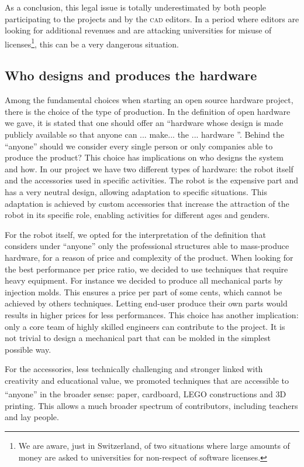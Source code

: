 \documentclass[letterpaper, 10 pt, conference]{ieeeconf}  %
\begin{document}
As a conclusion, this legal issue is totally underestimated by both people participating to the projects and by the \textsc{cad} editors. 
In a period where editors are looking for additional revenues and are attacking universities for misuse of licenses\footnote{We are aware, just in Switzerland, of two situations where large amounts of money are asked to universities for non-respect of software licenses.}, this can be a very dangerous situation.

\subsection{Who designs and produces the hardware}

Among the fundamental choices when starting an open source hardware project, there is the choice of the type of production. 
In the definition of open hardware we gave, it is stated that one should offer an ``hardware whose design is made publicly available so that anyone can ... make... the ... hardware ''.
Behind the ``anyone'' should we consider every single person or only companies able to produce the product?
This choice has implications on who designs the system and how.
In our project we have two different types of hardware: the robot itself and the accessories used in specific activities.
The robot is the expensive part and has a very neutral design, allowing adaptation to specific situations.
This adaptation is achieved by custom accessories that increase the attraction of the robot in its specific role, enabling activities for different ages and genders.

For the robot itself, we opted for the interpretation of the definition that considers under ``anyone'' only the professional structures able to mass-produce hardware, for a reason of price and complexity of the product. 
When looking for the best performance per price ratio, we decided to use techniques that require heavy equipment.
For instance we decided to produce all mechanical parts by injection molds. 
This ensures a price per part of some cents, which cannot be achieved by others techniques.
Letting end-user produce their own parts would results in higher prices for less performances. 
This choice has another implication: only a core team of highly skilled engineers can contribute to the project. 
It is not trivial to design a mechanical part that can be molded in the simplest possible way.

For the accessories, less technically challenging and stronger linked with creativity and educational value, we promoted techniques that are accessible to ``anyone'' in the broader sense: paper, cardboard, LEGO\textsuperscript{\textregistered} constructions and 3D printing. %
This allows a much broader spectrum of contributors, including teachers and lay people.
\end{document}
